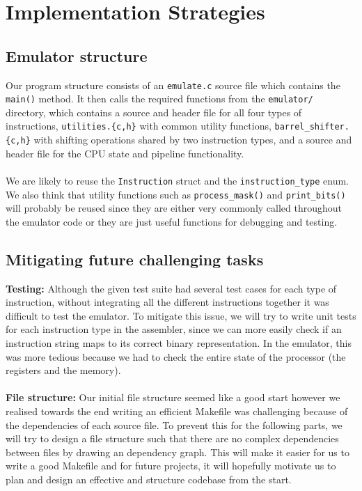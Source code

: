 \documentclass[11pt]{article}
\begin{document}
\section{Implementation Strategies}
\subsection{Emulator structure}
Our program structure consists of an \texttt{emulate.c} source file which contains the \texttt{main()} method. It then calls the required functions from the \texttt{emulator/} directory, which contains a source and header file for all four types of instructions, \texttt{utilities.\{c,h\}} with common utility functions, \texttt{barrel\_shifter.\{c,h\}} with shifting operations shared by two instruction types, and a source and header file for the CPU state and pipeline functionality.
\\\\
We are likely to reuse the \texttt{Instruction} struct and the \texttt{instruction\_type} enum. We also think that utility functions such as  \texttt{process\_mask()} and \texttt{print\_bits()} will probably be reused since they are either very commonly called throughout the emulator code or they are just useful functions for debugging and testing.

\subsection{Mitigating future challenging tasks}
\textbf{Testing:} Although the given test suite had several test cases for each type of instruction, without integrating all the different instructions together it was difficult to test the emulator. To mitigate this issue, we will try to write unit tests for each instruction type in the assembler, since we can more easily check if an instruction string maps to its correct binary representation. In the emulator, this was more tedious because we had to check the entire state of the processor (the registers and the memory).\\\\
\textbf{File structure:} Our initial file structure seemed like a good start however we realised towards the end writing an efficient Makefile was challenging because of the dependencies of each source file. To prevent this for the following parts, we will try to design a file structure such that there are no complex dependencies between files by drawing an dependency graph. This will make it easier for us to write a good Makefile and for future projects, it will hopefully motivate us to plan and design an effective and structure codebase from the start.
\end{document}
